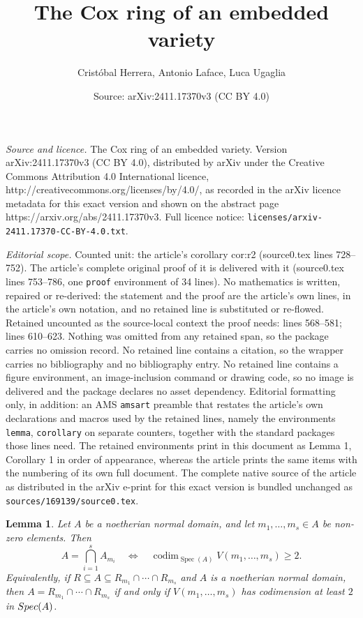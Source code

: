 \documentclass[10pt,a4paper]{amsart}
\title{The Cox ring of an embedded variety}
\author{Crist\'obal Herrera, Antonio Laface, Luca Ugaglia}
\date{Source: arXiv:2411.17370v3 (CC BY 4.0)}
\newtheorem{lemma}{Lemma}
\begin{document}
\maketitle

\noindent\emph{Source and licence.} The Cox ring of an embedded variety. Version arXiv:2411.17370v3 (CC BY 4.0), distributed by arXiv under the Creative Commons Attribution 4.0 International licence, http://creativecommons.org/licenses/by/4.0/, as recorded in the arXiv licence metadata for this exact version and shown on the abstract page https://arxiv.org/abs/2411.17370v3. Full licence notice: \texttt{licenses/arxiv-2411.17370-CC-BY-4.0.txt}.\par\smallskip

\noindent\textit{Editorial scope.} Counted unit: the article's corollary cor:r2 (source0.tex lines 728--752). The article's complete original proof of it is delivered with it (source0.tex lines 753--786, one \texttt{proof} environment of 34 lines). No mathematics is written, repaired or re-derived: the statement and the proof are the article's own lines, in the article's own notation, and no retained line is substituted or re-flowed.  Retained uncounted as the source-local context the proof needs: lines 568--581; lines 610--623.  Nothing was omitted from any retained span, so the package carries no omission record.  No retained line contains a citation, so the wrapper carries no bibliography and no bibliography entry.  No retained line contains a figure environment, an image-inclusion command or drawing code, so no image is delivered and the package declares no asset dependency.  Editorial formatting only, in addition: an AMS \texttt{amsart} preamble that restates the article's own declarations and macros used by the retained lines, namely the environments \texttt{lemma}, \texttt{corollary} on separate counters, together with the standard packages those lines need.  The retained environments print in this document as Lemma 1, Corollary 1 in order of appearance, whereas the article prints the same items with the numbering of its own full document.  The complete native source of the article as distributed in the arXiv e-print for this exact version is bundled unchanged as \texttt{sources/169139/source0.tex}.
\begin{lemma}
\label{pro:crit}
Let $A$ be a noetherian normal domain, and let $m_1,\dots,m_s\in A$ be
non-zero elements. Then
\[
A=\bigcap_{i=1}^s A_{m_i}
\quad\Longleftrightarrow\quad
\operatorname{codim}_{\operatorname{Spec}(A)}V(m_1,\dots,m_s)\ge 2.
\]
Equivalently, if $R\subseteq A\subseteq R_{m_1}\cap\cdots\cap R_{m_s}$ and
$A$ is a noetherian normal domain, then $A=R_{m_1}\cap\cdots\cap R_{m_s}$
if and only if $V(m_1,\dots,m_s)$ has codimension at least $2$ in
${\rm Spec}(A)$.
\end{lemma}
\end{document}

